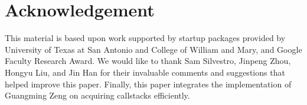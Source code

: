 \section{Acknowledgement}

This material is based upon work supported by %
startup packages provided by University of Texas at San Antonio and College of William and Mary, and Google Faculty Research Award. We would like to thank Sam Silvestro, Jinpeng Zhou, Hongyu Liu, and Jin Han for their invaluable comments and suggestions that helped improve this paper. Finally, this paper integrates the implementation of Guangming Zeng on acquiring callstacks efficiently.